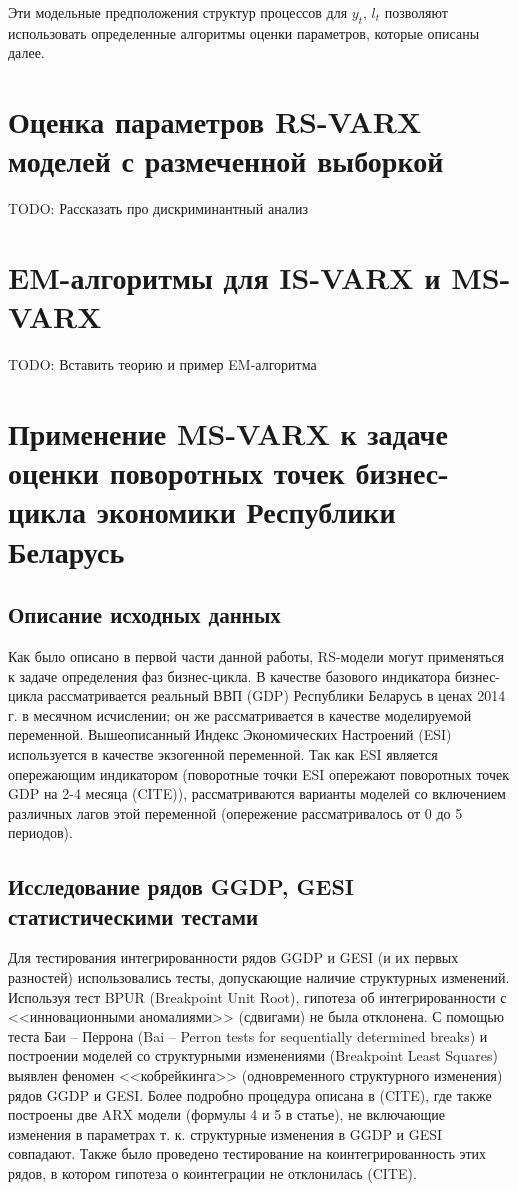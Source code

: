 \documentclass[a4paper,14pt]{extreport}
\begin{document}
Эти модельные предположения структур процессов для $y_t$, $l_t$ позволяют использовать определенные алгоритмы оценки параметров, которые описаны далее.


\section{Оценка параметров RS-VARX моделей с размеченной выборкой}

TODO: Рассказать про дискриминантный анализ

\section{EM-алгоритмы для IS-VARX и MS-VARX}

TODO: Вставить теорию и пример EM-алгоритма

\section{Применение MS-VARX к задаче оценки поворотных точек бизнес-цикла экономики Республики Беларусь}

\subsection{Описание исходных данных}

Как было описано в первой части данной работы, RS-модели могут применяться к задаче определения фаз бизнес-цикла. В качестве базового индикатора бизнес-цикла рассматривается реальный ВВП (GDP) Республики Беларусь в ценах 2014 г. в месячном исчислении; он же рассматривается в качестве моделируемой переменной. Вышеописанный Индекс Экономических Настроений (ESI) используется в качестве экзогенной переменной. Так как ESI является опережающим индикатором (поворотные точки ESI опережают поворотных точек GDP на 2-4 месяца (CITE)), рассматриваются варианты моделей со включением различных лагов этой переменной (опережение рассматривалось от 0 до 5 периодов).

\subsection{Исследование рядов GGDP, GESI статистическими тестами}

Для тестирования интегрированности рядов GGDP и GESI (и их первых разностей) использовались тесты, допускающие наличие структурных изменений. Используя тест BPUR (Breakpoint Unit Root), гипотеза об интегрированности с <<инновационными аномалиями>> (сдвигами) не была отклонена. С помощью теста Баи – Перрона (Bai – Perron tests for sequentially determined breaks) и построении моделей со структурными изменениями (Breakpoint Least Squares) выявлен феномен <<кобрейкинга>> (одновременного структурного изменения) рядов GGDP и GESI. Более подробно процедура описана в (CITE), где также построены две ARX модели (формулы 4 и 5 в статье), не включающие изменения в параметрах т. к.  структурные изменения в GGDP и GESI совпадают. Также было проведено тестирование на коинтегрированность этих рядов, в котором гипотеза о коинтеграции не отклонилась (CITE). 
\end{document}
